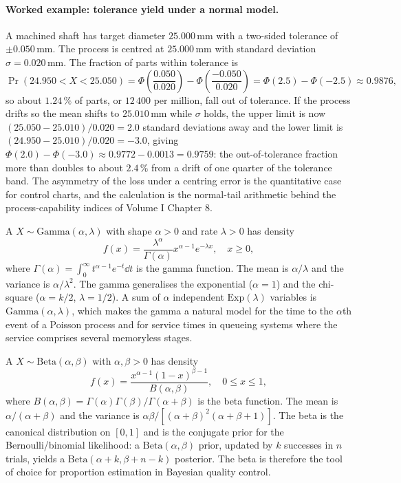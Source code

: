 \paragraph{Worked example: tolerance yield under a normal model.}
A machined shaft has target diameter $25.000\,\text{mm}$ with a
two-sided tolerance of $\pm 0.050\,\text{mm}$. The process is
centred at $25.000\,\text{mm}$ with standard deviation $\sigma =
0.020\,\text{mm}$. The fraction of parts within tolerance is
\[
\Pr(24.950 < X < 25.050)
= \Phi\!\left(\frac{0.050}{0.020}\right)
- \Phi\!\left(\frac{-0.050}{0.020}\right)
= \Phi(2.5) - \Phi(-2.5) \approx 0.9876,
\]
so about $1.24\,\%$ of parts, or $12\,400$ per million, fall out of
tolerance. If the process drifts so the mean shifts to
$25.010\,\text{mm}$ while $\sigma$ holds, the upper limit is now
$(25.050 - 25.010)/0.020 = 2.0$ standard deviations away and the
lower limit is $(24.950 - 25.010)/0.020 = -3.0$, giving
$\Phi(2.0) - \Phi(-3.0) \approx 0.9772 - 0.0013 = 0.9759$: the
out-of-tolerance fraction more than doubles to about $2.4\,\%$ from
a drift of one quarter of the tolerance band. The asymmetry of the
loss under a centring error is the quantitative case for control
charts, and the calculation is the normal-tail arithmetic behind
the process-capability indices of Volume I Chapter 8.

A  $X \sim \mathrm{Gamma}(\alpha,
\lambda)$ with shape $\alpha > 0$ and rate $\lambda > 0$ has
density
\[
f(x) = \frac{\lambda^{\alpha}}{\Gamma(\alpha)} x^{\alpha - 1}
e^{-\lambda x}, \quad x \geq 0,
\]
where $\Gamma(\alpha) = \int_{0}^{\infty} t^{\alpha - 1} e^{-t} \dd t$
is the gamma function. The mean is $\alpha/\lambda$ and the variance
is $\alpha/\lambda^{2}$. The gamma generalises the exponential
($\alpha = 1$) and the chi-square ($\alpha = k/2$, $\lambda = 1/2$).
A sum of $\alpha$ independent $\mathrm{Exp}(\lambda)$ variables is
$\mathrm{Gamma}(\alpha, \lambda)$, which makes the gamma a natural
model for the time to the $\alpha$th event of a Poisson process and
for service times in queueing systems where the service comprises
several memoryless stages.

A  $X \sim \mathrm{Beta}(\alpha,
\beta)$ with $\alpha, \beta > 0$ has density
\[
f(x) = \frac{x^{\alpha - 1}(1 - x)^{\beta - 1}}{B(\alpha, \beta)},
\quad 0 \leq x \leq 1,
\]
where $B(\alpha, \beta) = \Gamma(\alpha)\Gamma(\beta)/
\Gamma(\alpha + \beta)$ is the beta function. The mean is
$\alpha/(\alpha + \beta)$ and the variance is
$\alpha\beta/[(\alpha + \beta)^{2}(\alpha + \beta + 1)]$. The beta
is the canonical distribution on $[0, 1]$ and is the conjugate
prior for the Bernoulli/binomial likelihood: a $\mathrm{Beta}
(\alpha, \beta)$ prior, updated by $k$ successes in $n$ trials,
yields a $\mathrm{Beta}(\alpha + k, \beta + n - k)$ posterior. The
beta is therefore the tool of choice for proportion estimation in
Bayesian quality control.

